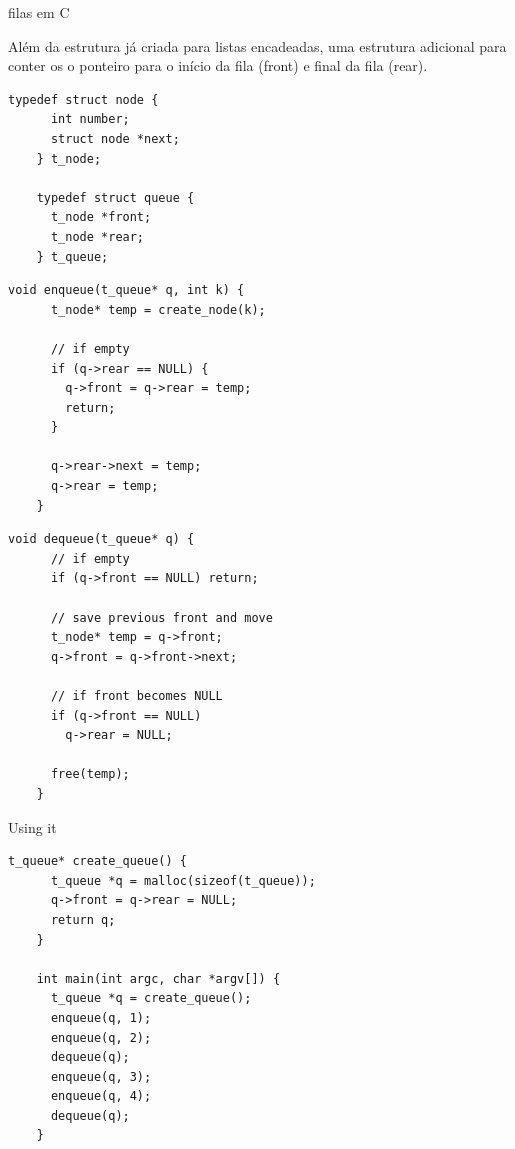 \documentclass{beamer}
\begin{document}
\begin{frame}{filas em C}
  
  Além da estrutura já criada para listas encadeadas, uma estrutura
  adicional para conter os o ponteiro para o início da fila (front) e
  final da fila (rear).

  \begin{lstlisting}[style=normalc,caption=queue/queue-list.c]
    typedef struct node {
      int number;
      struct node *next;
    } t_node;
    
    typedef struct queue {
      t_node *front;
      t_node *rear;
    } t_queue;
  \end{lstlisting}

  \framebreak

  \begin{lstlisting}[style=normalc,caption=queue/queue-list.c]
    void enqueue(t_queue* q, int k) {
      t_node* temp = create_node(k);

      // if empty
      if (q->rear == NULL) {
        q->front = q->rear = temp;
        return;
      }
      
      q->rear->next = temp;
      q->rear = temp;
    }
  \end{lstlisting}

  \framebreak

  \begin{lstlisting}[style=normalc,caption=queue/queue-list.c]
    void dequeue(t_queue* q) {
      // if empty
      if (q->front == NULL) return;

      // save previous front and move
      t_node* temp = q->front;
      q->front = q->front->next;

      // if front becomes NULL
      if (q->front == NULL)
        q->rear = NULL;
      
      free(temp);
    }
  \end{lstlisting}

  \framebreak

  Using it

  \begin{lstlisting}[style=normalc]
    t_queue* create_queue() {
      t_queue *q = malloc(sizeof(t_queue));
      q->front = q->rear = NULL;
      return q;
    }
    
    int main(int argc, char *argv[]) {
      t_queue *q = create_queue();
      enqueue(q, 1);
      enqueue(q, 2);
      dequeue(q);
      enqueue(q, 3);
      enqueue(q, 4);
      dequeue(q);
    }
  \end{lstlisting}
  
\end{frame}
\end{document}
